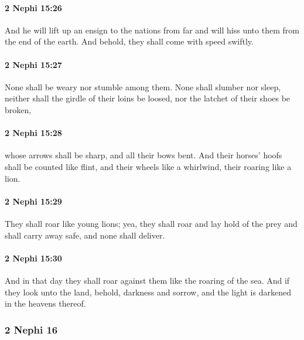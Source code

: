 		\paragraph{2 Nephi 15:26} %
			\label{2NEPHI-15-26}

			And he will lift up an ensign to the nations from far
			and will hiss unto them from the end of the earth.
			And behold, they shall come with speed swiftly.

		\paragraph{2 Nephi 15:27} %
			\label{2NEPHI-15-27}

			None shall be weary nor stumble among them.
			None shall slumber nor sleep,
			neither shall the girdle of their loins be loosed,
			nor the latchet of their shoes be broken,

		\paragraph{2 Nephi 15:28} %
			\label{2NEPHI-15-28}

			whose arrows shall be sharp,
			and all their bows bent.
			And their horses' hoofs shall be counted like flint,
			and their wheels like a whirlwind,
			their roaring like a lion.

		\paragraph{2 Nephi 15:29} %
			\label{2NEPHI-15-29}

			They shall roar like young lions;
			yea, they shall roar and lay hold of the prey
			and shall carry away safe, and none shall deliver.

		\paragraph{2 Nephi 15:30} %
			\label{2NEPHI-15-30}

			And in that day they shall roar against them like the roaring of the sea.
			And if they look unto the land, behold, darkness and sorrow,
			and the light is darkened in the heavens thereof.

	\subsubsection{2 Nephi 16} %
		\label{2NEPHI-16}
		
